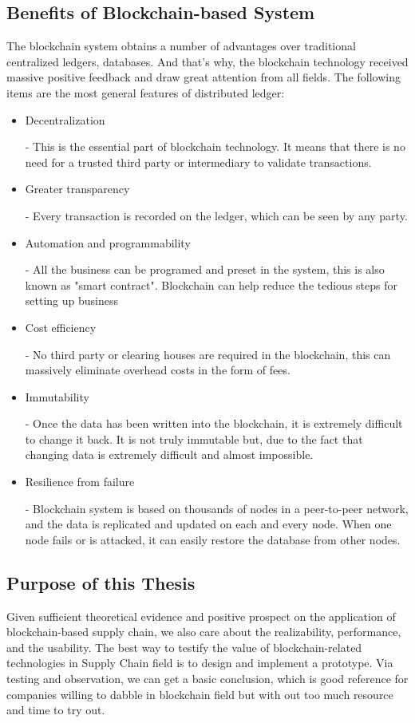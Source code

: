 \subsection{Benefits of Blockchain-based System}
The blockchain system obtains a number of advantages over traditional centralized ledgers, databases. And that's why, the blockchain technology received massive positive feedback and draw great attention from all fields. The following items are the most general features of distributed ledger:
\begin{itemize}
	\item Decentralization
	
	- This is the essential part of blockchain technology. It means that there is no need for a trusted third party or intermediary to validate transactions.
	
	\item Greater transparency
	
	- Every transaction is recorded on the ledger, which can be seen by any party.
	
	\item Automation and programmability
	
	- All the business can be programed and preset in the system, this is also known as "smart contract". Blockchain can help reduce the tedious steps for setting up business
	 
	\item Cost efficiency
	
	- No third party or clearing houses are required in the blockchain, this can massively eliminate overhead costs in the form of fees.
	
	\item Immutability
	
	- Once the data has been written into the blockchain, it is extremely difficult to change it back. It is not truly immutable but, due to the fact that changing data is extremely difficult and almost impossible.
	
	\item Resilience from failure
	
	- Blockchain system is based on thousands of nodes in a peer-to-peer network, and the data is replicated and updated on each and every node. When one node fails or is attacked, it can easily restore the database from other nodes.
	
\end{itemize}


\subsection{Purpose of this Thesis}
Given sufficient theoretical evidence and positive prospect on the application of blockchain-based supply chain, we also care about the realizability, performance, and the usability. The best way to testify the value of blockchain-related technologies in Supply Chain field is to design and implement a prototype. Via testing and observation, we can get a basic conclusion, which is good reference for companies willing to dabble in blockchain field but with out too much resource and time to try out.

